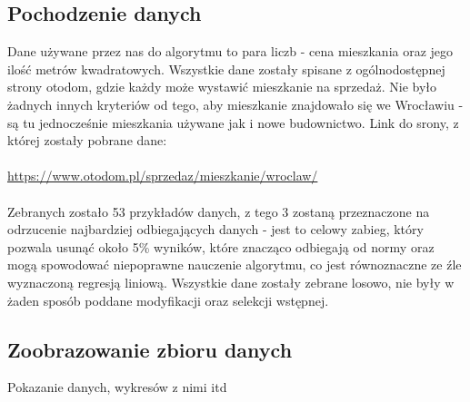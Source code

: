 	\subsection{Pochodzenie danych}
Dane używane przez nas do algorytmu to para liczb - cena mieszkania oraz jego ilość metrów kwadratowych. Wszystkie dane zostały spisane z ogólnodostępnej strony otodom, gdzie każdy może wystawić mieszkanie na sprzedaż. Nie było żadnych innych kryteriów od tego, aby mieszkanie znajdowało się we Wrocławiu - są tu jednocześnie mieszkania używane jak i nowe budownictwo. Link do srony, z której zostały pobrane dane:
\\
\\
\url{https://www.otodom.pl/sprzedaz/mieszkanie/wroclaw/}
\\
\\
Zebranych zostało 53 przykładów danych, z tego 3 zostaną przeznaczone na odrzucenie najbardziej odbiegających danych - jest to celowy zabieg, który pozwala usunąć około 5\% wyników, które znacząco odbiegają od normy oraz mogą spowodować niepoprawne nauczenie algorytmu, co jest równoznaczne ze źle wyznaczoną regresją liniową. Wszystkie dane zostały zebrane losowo, nie były w żaden sposób poddane modyfikacji oraz selekcji wstępnej.
	\subsection{Zoobrazowanie zbioru danych}
Pokazanie danych, wykresów z nimi itd

